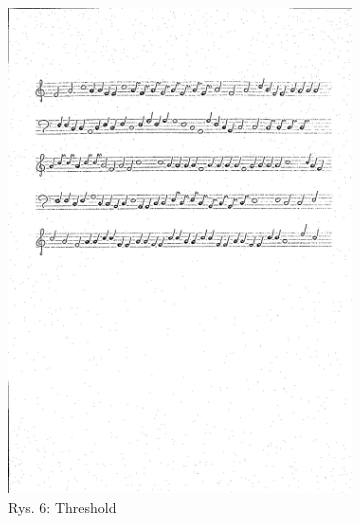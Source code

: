 \documentclass[11pt]{article}
\begin{document}
\begin{figure}[H]
    \centering
    \captionsetup[subfigure]{labelformat=empty}
    \begin{subfigure}{.5\textwidth}
        \centering
        \graphicspath{ {staffs/} }
        \includegraphics[width=\linewidth]{staffs4_thr.png}
        \caption{Rys. 6: Threshold}
        \label{fig:sub1}
    \end{subfigure}%
    \hfill
    \begin{subfigure}{.5\textwidth}
        \centering
        \graphicspath{ {staffs/} }

\end{subfigure}
\end{figure}
\end{document}

